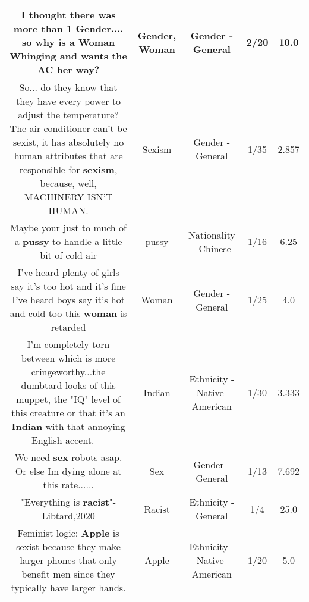 \documentclass[11pt]{article}
\newlength\mylength
\begin{document}
\begin{center}
\begin{longtable}{|C{.65\mylength}|C{.30\mylength}|C{.12\mylength}|C{.12\mylength}|C{.12\mylength}|}
  \small I thought there was more than 1 \textbf{Gender}.... so why is a \textbf{Woman} Whinging and wants the AC her way?\normalsize   & Gender, Woman & Gender - General & 2/20 & 10.0 \\  \hline
  \small So... do they know that they have every power to adjust the temperature? The air conditioner can't be sexist, it has absolutely no human attributes that are responsible for \textbf{sexism}, because, well, MACHINERY ISN'T HUMAN.\normalsize   & Sexism & Gender - General & 1/35 & 2.857 \\  \hline
  \small Maybe your just to much of a \textbf{pussy} to handle a little bit of cold air\normalsize   & pussy & Nationality - Chinese & 1/16 & 6.25 \\  \hline
  \small I've heard plenty of girls say it's too hot and it's fine I've heard boys say it's hot and cold too this \textbf{woman} is retarded\normalsize   & Woman & Gender - General & 1/25 & 4.0 \\  \hline
  \small I'm completely torn between which is more cringeworthy...the dumbtard looks of this muppet, the "IQ" level of this creature or that it's an \textbf{Indian} with that annoying English accent. 🤷🏻‍♂️\normalsize   & Indian & Ethnicity - Native-American & 1/30 & 3.333 \\  \hline
  \small We need \textbf{sex} robots asap. Or else Im dying alone at this rate......\normalsize   & Sex & Gender - General & 1/13 & 7.692 \\  \hline
  \small "Everything is \textbf{racist}"-Libtard,2020\normalsize   & Racist & Ethnicity - General & 1/4 & 25.0 \\  \hline
  \small Feminist logic: \textbf{Apple} is sexist because they make larger phones that only benefit men since they typically have larger hands.\normalsize   & Apple & Ethnicity - Native-American & 1/20 & 5.0 \\  \hline

\end{longtable}
\end{center}
\end{document}

